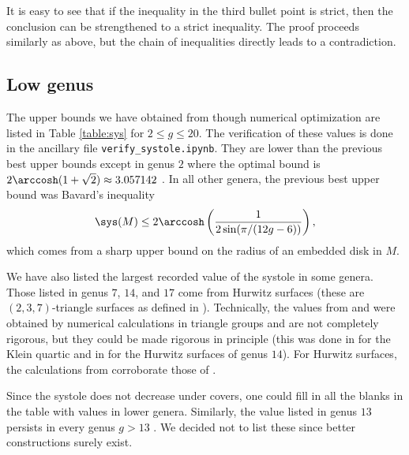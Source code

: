 \documentclass[12pt]{amsart}
\numberwithin{equation}{section}
\begin{document}
\begin{rem}
It is easy to see that if the inequality in the third bullet point is strict, then the conclusion can be strengthened to a strict inequality. The proof proceeds similarly as above, but the chain of inequalities directly leads to a contradiction.
\end{rem}


\subsection{Low genus}

The upper bounds we have obtained from  though numerical optimization are listed in Table \ref{table:sys}  for $2\leq g \leq 20$. The verification of these values is done in the ancillary file \texttt{verify\_systole.ipynb}. They are lower than the previous best upper bounds except in genus $2$ where the optimal bound is $2\arccosh(1+\sqrt{2})\approx 3.057142$ \cite{Jenni}. In all other genera, the previous best upper bound was Bavard's inequality \cite{Bavard}
\begin{equation} \label{eq:Bavard}
\sys(M) \leq 2\arccosh\left( \frac{1}{2\sin(\pi / (12g-6))} \right),
\end{equation}
which comes from a sharp upper bound on the radius of an embedded disk in $M$.

We have also listed the largest recorded value of the systole in some genera. Those listed in genus $7$, $14$, and $17$ come from Hurwitz surfaces (these are $(2,3,7)$-triangle surfaces as defined in ). Technically, the values from \cite{VogelerThesis} and \cite{ScheinShoan} were obtained by numerical calculations in triangle groups and are not completely rigorous, but they could be made rigorous in principle (this was done in \cite{DT} for the Klein quartic and in \cite{Woods} for the Hurwitz surfaces of genus $14$). For Hurwitz surfaces, the calculations from \cite{ScheinShoan} corroborate those of \cite{VogelerThesis}.

Since the systole does not decrease under covers, one could fill in all the blanks in the table with values in lower genera. Similarly, the value listed in genus $13$ persists in every genus $g >13$ \cite{FBRafi}. We decided not to list these since better constructions surely exist.
\end{document}
